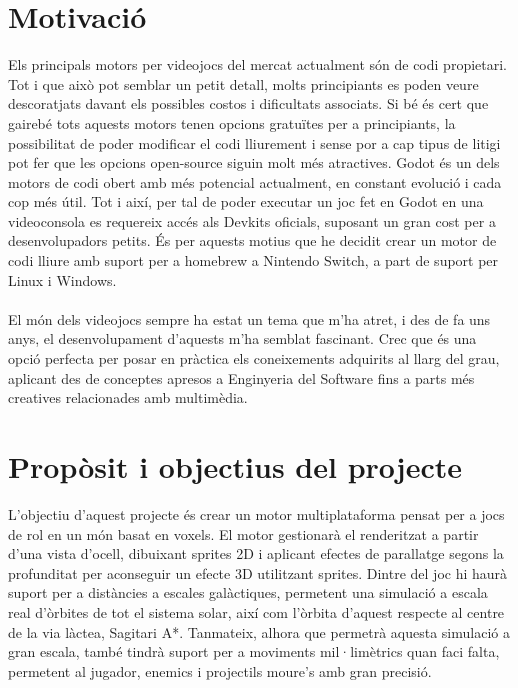 \section{Motivació}
Els principals motors per videojocs del mercat actualment són de codi propietari. Tot i que això pot semblar un petit detall, molts principiants es poden veure descoratjats davant els possibles costos i dificultats associats.
Si bé és cert que gairebé tots aquests motors tenen opcions gratuïtes per a principiants, la possibilitat de poder modificar el codi lliurement i sense por a cap tipus de litigi pot fer que les opcions open-source siguin molt més atractives.
Godot és un dels motors de codi obert amb més potencial actualment, en constant evolució i cada cop més útil. Tot i així, per tal de poder executar un joc fet en Godot en una videoconsola es requereix accés als Devkits oficials, suposant un gran cost per a desenvolupadors petits.
És per aquests motius que he decidit crear un motor de codi lliure amb suport per a homebrew a Nintendo Switch, a part de suport per Linux i Windows.
\paragraph{}
El món dels videojocs sempre ha estat un tema que m'ha atret, i des de fa uns anys, el desenvolupament d'aquests m'ha semblat fascinant.
Crec que és una opció perfecta per posar en pràctica els coneixements adquirits al llarg del grau, aplicant des de conceptes apresos a Enginyeria del Software fins a parts més creatives relacionades amb multimèdia.
\section{Propòsit i objectius del projecte}
L'objectiu d'aquest projecte és crear un motor multiplataforma pensat per a jocs de rol en un món basat en voxels.
El motor gestionarà el renderitzat a partir d'una vista d'ocell, dibuixant sprites 2D i aplicant efectes de parallatge segons la profunditat per aconseguir un efecte 3D utilitzant sprites.
Dintre del joc hi haurà suport per a distàncies a escales galàctiques, permetent una simulació a escala real d'òrbites de tot el sistema solar, així com l'òrbita d'aquest respecte al centre de la via làctea, Sagitari A*.
Tanmateix, alhora que permetrà aquesta simulació a gran escala, també tindrà suport per a moviments mil·limètrics quan faci falta, permetent al jugador, enemics i projectils moure's amb gran precisió.

